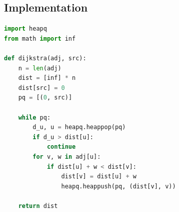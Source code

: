 \subsection{Implementation}

\begin{lstlisting}[language=Python]
import heapq
from math import inf

def dijkstra(adj, src):
    n = len(adj)
    dist = [inf] * n
    dist[src] = 0
    pq = [(0, src)]

    while pq:
        d_u, u = heapq.heappop(pq)
        if d_u > dist[u]:
            continue
        for v, w in adj[u]:
            if dist[u] + w < dist[v]:
                dist[v] = dist[u] + w
                heapq.heappush(pq, (dist[v], v))

    return dist
\end{lstlisting}
